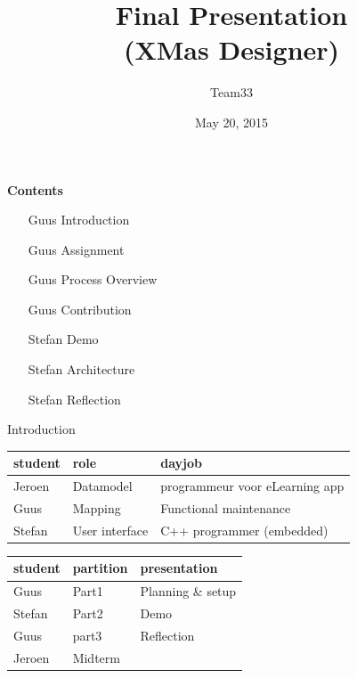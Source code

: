\documentclass[11pt]{beamer}
\author{Team33}
\title{Final Presentation\\(XMas Designer)}
\institute{Open University\\team033\\Guus Bonnema, Stefan Versluys, Jeroen Kleijn}
\date{May 20, 2015}
\begin{document}
\newcommand{\Noc}{\textsc{NoC}\xspace}
\newcommand{\qt}{\textsc{Qt}\xspace}
\newcommand{\qml}{\textsc{Qml}\xspace}

\begin{frame}
	\titlepage
\end{frame}

\begin{frame}
	{\bf Contents}
	\begin{itemize}
		\item [Guus] Introduction 
		\item [Guus] Assignment
		\item [Guus] Process Overview
		\item [Guus] Contribution
		\item [Stefan] Demo
		\item [Stefan] Architecture
		\item [Stefan] Reflection
	\end{itemize}
	
\end{frame}

\begin{frame}{Introduction}
	\begin{tabular}{lp{2.5cm}p{4cm}}
	\hline
	{\bf student} & {\bf role}      & {\bf dayjob}\\\hline
	Jeroen        &  Datamodel      & programmeur voor eLearning app\\
	Guus		  &  Mapping        & Functional maintenance\\
	Stefan        &  User interface & C++ programmer (embedded)\\
	\hline
	\end{tabular}
	\vspace{1cm}
	\begin{tabular}{lp{2.5cm}p{4cm}}
	\hline
	{\bf student} & {\bf partition} & {\bf presentation}\\\hline
	Guus		  &  Part1          & Planning \& setup\\
	Stefan        &  Part2          & Demo \\
	Guus		  &  part3			& Reflection\\
	Jeroen        &  Midterm        & \\
	\hline
	\end{tabular}
\end{frame}
\end{document}

